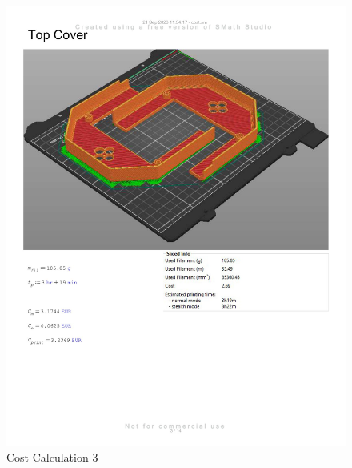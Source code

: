 \begin{figure}[H]
    \centering
    \includegraphics[width=\linewidth]{texs/appendix/data/cost1-03.jpg}
    \caption{Cost Calculation 3}
    \label{fig:cost-calculation-3}
\end{figure}

